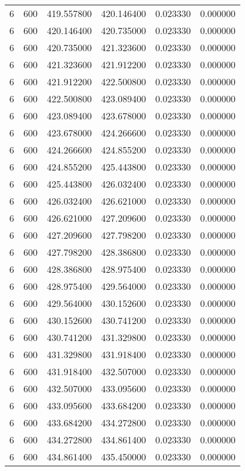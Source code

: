 \begin{longtable}{rrrrrr}
6 & 600 & 419.557800 & 420.146400 & 0.023330 & 0.000000 \\
6 & 600 & 420.146400 & 420.735000 & 0.023330 & 0.000000 \\
6 & 600 & 420.735000 & 421.323600 & 0.023330 & 0.000000 \\
6 & 600 & 421.323600 & 421.912200 & 0.023330 & 0.000000 \\
6 & 600 & 421.912200 & 422.500800 & 0.023330 & 0.000000 \\
6 & 600 & 422.500800 & 423.089400 & 0.023330 & 0.000000 \\
6 & 600 & 423.089400 & 423.678000 & 0.023330 & 0.000000 \\
6 & 600 & 423.678000 & 424.266600 & 0.023330 & 0.000000 \\
6 & 600 & 424.266600 & 424.855200 & 0.023330 & 0.000000 \\
6 & 600 & 424.855200 & 425.443800 & 0.023330 & 0.000000 \\
6 & 600 & 425.443800 & 426.032400 & 0.023330 & 0.000000 \\
6 & 600 & 426.032400 & 426.621000 & 0.023330 & 0.000000 \\
6 & 600 & 426.621000 & 427.209600 & 0.023330 & 0.000000 \\
6 & 600 & 427.209600 & 427.798200 & 0.023330 & 0.000000 \\
6 & 600 & 427.798200 & 428.386800 & 0.023330 & 0.000000 \\
6 & 600 & 428.386800 & 428.975400 & 0.023330 & 0.000000 \\
6 & 600 & 428.975400 & 429.564000 & 0.023330 & 0.000000 \\
6 & 600 & 429.564000 & 430.152600 & 0.023330 & 0.000000 \\
6 & 600 & 430.152600 & 430.741200 & 0.023330 & 0.000000 \\
6 & 600 & 430.741200 & 431.329800 & 0.023330 & 0.000000 \\
6 & 600 & 431.329800 & 431.918400 & 0.023330 & 0.000000 \\
6 & 600 & 431.918400 & 432.507000 & 0.023330 & 0.000000 \\
6 & 600 & 432.507000 & 433.095600 & 0.023330 & 0.000000 \\
6 & 600 & 433.095600 & 433.684200 & 0.023330 & 0.000000 \\
6 & 600 & 433.684200 & 434.272800 & 0.023330 & 0.000000 \\
6 & 600 & 434.272800 & 434.861400 & 0.023330 & 0.000000 \\
6 & 600 & 434.861400 & 435.450000 & 0.023330 & 0.000000 \\

\end{longtable}
